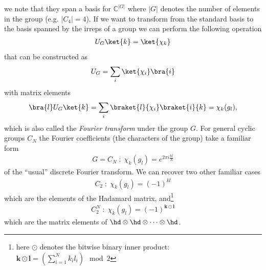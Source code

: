 we note that they span a basis for $\mathbb{C}^{|G|}$ where $|G|$ denotes the number of elements in the group (e.g. $|C_4|=4$). If we want to transform from the standard basis to the basis spanned by the irreps of a group we can perform the following operation 
\begin{align*}
    U_G\ket{k} = \ket{\chi_k}
\end{align*}
that can be constructed as
\begin{align*}
    U_G = \sum_i \ket{\chi_i}\bra{i}
\end{align*}
with matrix elements
\begin{align}
    \bra{l}U_G\ket{k} = \sum_i \braket{l}{\chi_i}\braket{i}{k} = \chi_k(g_l),
\end{align}
which is also called the \textit{Fourier transform} under the group $G$.
For general cyclic groups $C_N$ the Fourier coefficients (the characters of the group) take a familiar form
\begin{align}
    G=C_N \;:\;\chi_k(g_l) = e^{2\pi i \frac{kl}{N}}
\end{align}
of the ``usual'' discrete Fourier transform. We can recover two other familiar cases
\begin{align}
    C_2 \;:\; \chi_k(g_l) = (-1)^{kl} 
\end{align}
which are the elements of the Hadamard matrix, and\footnote{here $\odot$ denotes the bitwise binary inner product: $\mathbf{k}\odot \mathbf{l} = \left( \sum_{i=1}^{N} k_i l_i \right)\mod 2$}
\begin{align}
    C_{2}^N \;:\;\chi_{k}(g_l) = (-1)^{\mathbf{k}\odot \mathbf{l}}
\end{align}
which are the matrix elements of $\hd\otimes\hd\otimes\dots\otimes\hd$.



